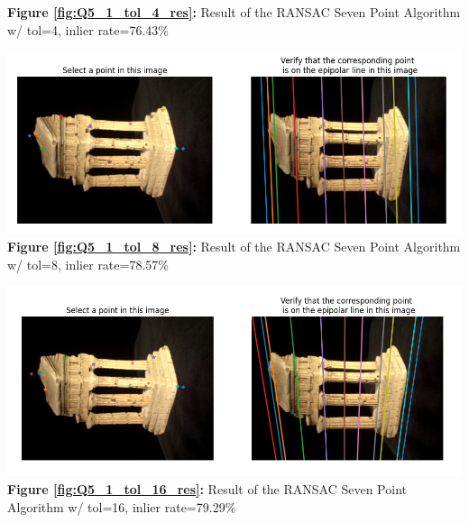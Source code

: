 \begin{your_solution}[title=Q5.1 continued, height=22.5cm,width=\linewidth]
\begin{minipage}{1\linewidth}
	\textbf{Figure \ref{fig:Q5_1_tol_4_res}:} Result of the RANSAC Seven Point Algorithm w/ tol=4, inlier rate=76.43\% %
	\label{fig:Q5_1_tol_4_res}         %
\end{minipage}
	
\end{your_solution}
\newpage
\begin{your_solution}[title=Q5.1 continued, height=22.5cm,width=\linewidth]
	\begin{minipage}{1\linewidth}
		\centering
		\includegraphics[width=1\linewidth, height=0.39\columnwidth]{../Q5_1_ransac_seven_tol_8_result.png}
		\textbf{Figure \ref{fig:Q5_1_tol_8_res}:} Result of the RANSAC Seven Point Algorithm w/ tol=8, inlier rate=78.57\% %
		\label{fig:Q5_1_tol_8_res}         %
	\end{minipage}
	\hfill
	\begin{minipage}{1\linewidth}
		\centering
		\includegraphics[width=1\linewidth, height=0.39\columnwidth]{../Q5_1_ransac_seven_tol_16_result.png}
		\textbf{Figure \ref{fig:Q5_1_tol_16_res}:} Result of the RANSAC Seven Point Algorithm w/ tol=16, inlier rate=79.29\% %
		\label{fig:Q5_1_tol_16_res}         %
	\end{minipage}

\end{your_solution}
